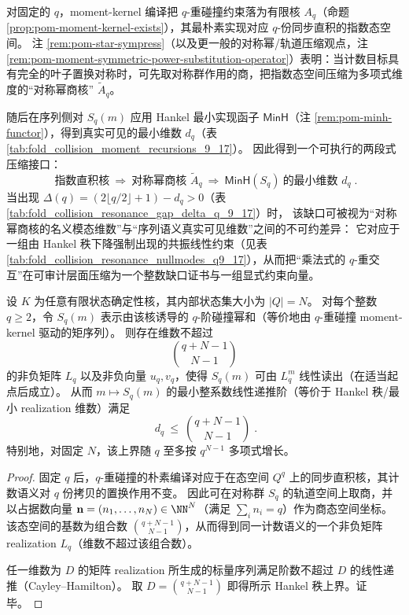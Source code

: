 \begin{remark}\label{rem:pom-sympower-then-minh}
对固定的 \(q\)，moment-kernel 编译把 \(q\)-重碰撞约束落为有限核 \(A_q\)（命题 \ref{prop:pom-moment-kernel-exists}），其最朴素实现对应 \(q\)-份同步直积的指数态空间。
注 \ref{rem:pom-star-sympress}（以及更一般的对称幂/轨道压缩观点，注 \ref{rem:pom-moment-symmetric-power-substitution-operator}）表明：当计数目标具有完全的叶子置换对称时，可先取对称群作用的商，把指数态空间压缩为多项式维度的“对称幂商核” \(\widetilde A_q\)。
\par
随后在序列侧对 \(S_q(m)\) 应用 Hankel 最小实现函子 \(\mathsf{MinH}\)（注 \ref{rem:pom-minh-functor}），得到真实可见的最小维数 \(d_q\)（表 \ref{tab:fold_collision_moment_recursions_9_17}）。
因此得到一个可执行的两段式压缩接口：
\[
\boxed{\;
\text{指数直积核}\ \Longrightarrow\ \text{对称幂商核 }\widetilde A_q\ \Longrightarrow\ \mathsf{MinH}(S_q)\ \text{的最小维数 }d_q\; }.
\]
当出现 \(\Delta(q)=(2\lfloor q/2\rfloor+1)-d_q>0\)（表 \ref{tab:fold_collision_resonance_gap_delta_q_9_17}）时，
该缺口可被视为“对称幂商核的名义模态维数”与“序列语义真实可见维数”之间的不可约差异：
它对应于一组由 Hankel 秩下降强制出现的共振线性约束（见表 \ref{tab:fold_collision_resonance_nullmodes_q9_17}），从而把“乘法式的 \(q\)-重交互”在可审计层面压缩为一个整数缺口证书与一组显式约束向量。
\end{remark}

\begin{theorem}\label{thm:pom-sympower-hankel-polynomial-upper-bound}
设 \(K\) 为任意有限状态确定性核，其内部状态集大小为 \(|Q|=N\)。
对每个整数 \(q\ge 2\)，令 \(S_q(m)\) 表示由该核诱导的 \(q\)-阶碰撞幂和（等价地由 \(q\)-重碰撞 moment-kernel 驱动的矩序列）。
则存在维数不超过
\[
\binom{q+N-1}{N-1}
\]
的非负矩阵 \(L_q\) 以及非负向量 \(u_q,v_q\)，使得 \(S_q(m)\) 可由 \(L_q^m\) 线性读出（在适当起点后成立）。
从而 \(m\mapsto S_q(m)\) 的最小整系数线性递推阶（等价于 Hankel 秩/最小 realization 维数）满足
\[
\boxed{\;
d_q\ \le\ \binom{q+N-1}{N-1}\; }.
\]
特别地，对固定 \(N\)，该上界随 \(q\) 至多按 \(q^{N-1}\) 多项式增长。
\end{theorem}

\begin{proof}
固定 \(q\) 后，\(q\)-重碰撞的朴素编译对应于在态空间 \(Q^q\) 上的同步直积核，其计数语义对 \(q\) 份拷贝的置换作用不变。
因此可在对称群 \(S_q\) 的轨道空间上取商，并以占据数向量 \(\mathbf n=(n_1,\dots,n_N)\in\NN^N\)（满足 \(\sum_i n_i=q\)）作为商态空间坐标。
该态空间的基数为组合数 \(\binom{q+N-1}{N-1}\)，从而得到同一计数语义的一个非负矩阵 realization \(L_q\)（维数不超过该组合数）。
\par
任一维数为 \(D\) 的矩阵 realization 所生成的标量序列满足阶数不超过 \(D\) 的线性递推（Cayley--Hamilton）。
取 \(D=\binom{q+N-1}{N-1}\) 即得所示 Hankel 秩上界。证毕。
\end{proof}

